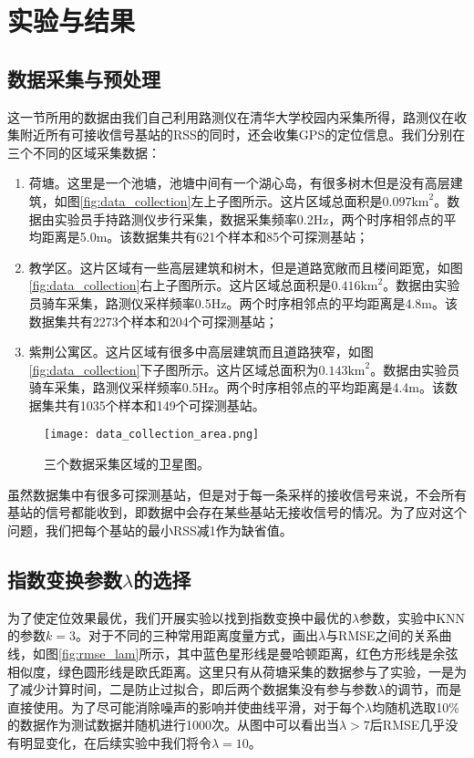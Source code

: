 \section{实验与结果} \label{sec:exp}

\subsection{数据采集与预处理}

这一节所用的数据由我们自己利用路测仪在清华大学校园内采集所得，路测仪在收集附近所有可接收信号基站的RSS的同时，还会收集GPS的定位信息。我们分别在三个不同的区域采集数据：
\begin{enumerate}
	\item 荷塘。这里是一个池塘，池塘中间有一个湖心岛，有很多树木但是没有高层建筑，如图\eqref{fig:data_collection}左上子图所示。这片区域总面积是$0.097\mathrm{km}^2$。数据由实验员手持路测仪步行采集，数据采集频率0.2Hz，两个时序相邻点的平均距离是5.0m。该数据集共有621个样本和85个可探测基站；
	\item 教学区。这片区域有一些高层建筑和树木，但是道路宽敞而且楼间距宽，如图\eqref{fig:data_collection}右上子图所示。这片区域总面积是$0.416\mathrm{km}^2$。数据由实验员骑车采集，路测仪采样频率0.5Hz。两个时序相邻点的平均距离是4.8m。该数据集共有2273个样本和204个可探测基站；
	\item 紫荆公寓区。这片区域有很多中高层建筑而且道路狭窄，如图\eqref{fig:data_collection}下子图所示。这片区域总面积为$0.143\mathrm{km}^2$。数据由实验员骑车采集，路测仪采样频率0.5Hz。两个时序相邻点的平均距离是4.4m。该数据集共有1035个样本和149个可探测基站。
\end{enumerate}

\begin{figure}[htb]
	\centering
	\texttt{[image: data\_collection\_area.png]}
	\caption{三个数据采集区域的卫星图。}
	\label{fig:data_collection}
\end{figure}

虽然数据集中有很多可探测基站，但是对于每一条采样的接收信号来说，不会所有基站的信号都能收到，即数据中会存在某些基站无接收信号的情况。为了应对这个问题，我们把每个基站的最小RSS减1作为缺省值。

\subsection{指数变换参数$\lambda$的选择} \label{subsec:lambda}

为了使定位效果最优，我们开展实验以找到指数变换中最优的$\lambda$参数，实验中KNN的参数$k=3$。对于不同的三种常用距离度量方式，画出$\lambda$与RMSE之间的关系曲线，如图\ref{fig:rmse_lam}所示，其中蓝色星形线是曼哈顿距离，红色方形线是余弦相似度，绿色圆形线是欧氏距离。这里只有从荷塘采集的数据参与了实验，一是为了减少计算时间，二是防止过拟合，即后两个数据集没有参与参数$\lambda$的调节，而是直接使用。为了尽可能消除噪声的影响并使曲线平滑，对于每个$\lambda$均随机选取10\%的数据作为测试数据并随机进行1000次。从图中可以看出当$\lambda>7$后RMSE几乎没有明显变化，在后续实验中我们将令$\lambda=10$。

